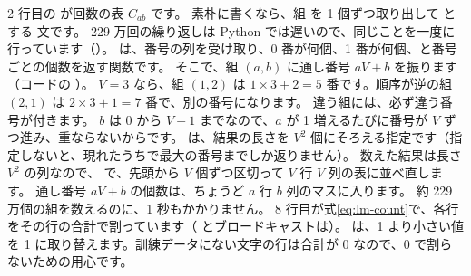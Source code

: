 2 行目の  が回数の表 $C_{ab}$ です。
素朴に書くなら、組  を 1 個ずつ取り出して  とする  文です。
229 万回の繰り返しは Python では遅いので、同じことを一度に行っています（）。
 は、番号の列を受け取り、0 番が何個、1 番が何個、と番号ごとの個数を返す関数です。
そこで、組 $(a,b)$ に通し番号 $aV+b$ を振ります（コードの ）。
$V=3$ なら、組 $(1,2)$ は $1\times3+2=5$ 番です。順序が逆の組 $(2,1)$ は $2\times3+1=7$ 番で、別の番号になります。
違う組には、必ず違う番号が付きます。
$b$ は 0 から $V-1$ までなので、$a$ が 1 増えるたびに番号が $V$ ずつ進み、重ならないからです。
 は、結果の長さを $V^{2}$ 個にそろえる指定です（指定しないと、現れたうちで最大の番号までしか返りません）。
数えた結果は長さ $V^{2}$ の列なので、 で、先頭から $V$ 個ずつ区切って $V$ 行 $V$ 列の表に並べ直します。
通し番号 $aV+b$ の個数は、ちょうど $a$ 行 $b$ 列のマスに入ります。
約 229 万個の組を数えるのに、1 秒もかかりません。
8 行目が式\eqref{eq:lm-count}で、各行をその行の合計で割っています（ とブロードキャストは）。
 は、1 より小さい値を 1 に取り替えます。訓練データにない文字の行は合計が 0 なので、0 で割らないための用心です。

